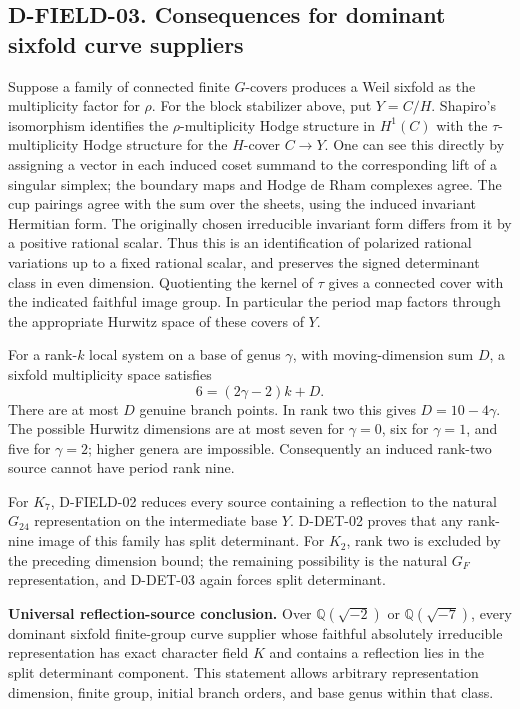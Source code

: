 \subsection*{D-FIELD-03. Consequences for dominant sixfold curve suppliers}

Suppose a family of connected finite \(G\)-covers produces a Weil
sixfold as the multiplicity factor for \(\rho\). For the block
stabilizer above, put \(Y=C/H\). Shapiro's isomorphism identifies
the \(\rho\)-multiplicity Hodge structure in \(H^1(C)\) with the
\(\tau\)-multiplicity Hodge structure for the \(H\)-cover \(C\to Y\).
One can see this directly by assigning a vector in each induced coset
summand to the corresponding lift of a singular simplex; the boundary
maps and Hodge de Rham complexes agree. The cup pairings agree with
the sum over the sheets, using the induced invariant Hermitian form.
The originally chosen irreducible invariant form differs from it by a
positive rational scalar. Thus this is an identification of polarized
rational variations up to a fixed rational scalar, and preserves the
signed determinant class in even dimension. Quotienting the kernel
of \(\tau\) gives a connected cover with the indicated faithful
image group. In particular the period map factors through the appropriate
Hurwitz space of these covers of \(Y\).

For a rank-\(k\) local system on a base of genus \(\gamma\), with
moving-dimension sum \(D\), a sixfold multiplicity space satisfies
\[
                       6=(2\gamma-2)k+D.
\]
There are at most \(D\) genuine branch points. In rank two this
gives \(D=10-4\gamma\). The possible Hurwitz dimensions are at
most seven for \(\gamma=0\), six for \(\gamma=1\), and five for
\(\gamma=2\); higher genera are impossible. Consequently an induced
rank-two source cannot have period rank nine.

For \(K_7\), D-FIELD-02 reduces every source containing a reflection
to the natural \(G_{24}\) representation on the intermediate base
\(Y\). D-DET-02 proves that any rank-nine image of this family has
split determinant. For \(K_2\), rank two is excluded by the preceding
dimension bound; the remaining possibility is the natural \(G_F\)
representation, and D-DET-03 again forces split determinant.

\textbf{Universal reflection-source conclusion.}
Over \(\mathbb Q(\sqrt{-2})\) or \(\mathbb Q(\sqrt{-7})\), every
dominant sixfold finite-group curve supplier whose faithful absolutely
irreducible representation has exact character field \(K\) and contains
a reflection lies in the split determinant component. This statement
allows arbitrary representation dimension, finite group, initial branch
orders, and base genus within that class.

